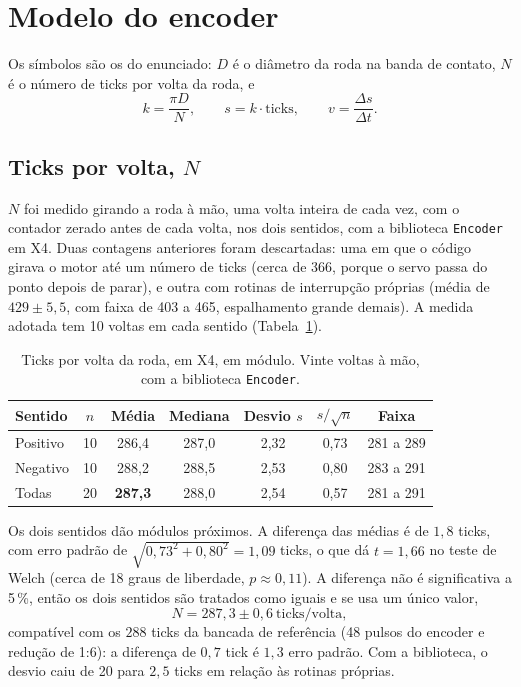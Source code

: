\documentclass[11pt,a4paper]{article}
\begin{document}
\section{Modelo do encoder}
\label{sec:encoder}

Os símbolos são os do enunciado: $D$ é o diâmetro da roda na banda de contato, $N$ é o número de ticks por volta da roda, e
\begin{equation}
  k = \frac{\pi D}{N}, \qquad s = k \cdot \text{ticks}, \qquad v = \frac{\Delta s}{\Delta t}.
\end{equation}

\subsection{Ticks por volta, $N$}

$N$ foi medido girando a roda à mão, uma volta inteira de cada vez, com o contador zerado antes de cada volta, nos dois sentidos, com a biblioteca \texttt{Encoder} em X4. Duas contagens anteriores foram descartadas: uma em que o código girava o motor até um número de ticks (cerca de 366, porque o servo passa do ponto depois de parar), e outra com rotinas de interrupção próprias (média de $429 \pm 5{,}5$, com faixa de 403 a 465, espalhamento grande demais). A medida adotada tem 10 voltas em cada sentido (Tabela~\ref{tab:N}).

\begin{table}[htbp]
\centering
\caption{Ticks por volta da roda, em X4, em módulo. Vinte voltas à mão, com a biblioteca \texttt{Encoder}.}
\label{tab:N}
\begin{tabular}{lcccccc}
\toprule
Sentido & $n$ & Média & Mediana & Desvio $s$ & $s/\sqrt{n}$ & Faixa \\
\midrule
Positivo & 10 & 286,4 & 287,0 & 2,32 & 0,73 & 281 a 289 \\
Negativo & 10 & 288,2 & 288,5 & 2,53 & 0,80 & 283 a 291 \\
Todas    & 20 & \textbf{287,3} & 288,0 & 2,54 & 0,57 & 281 a 291 \\
\bottomrule
\end{tabular}
\end{table}

Os dois sentidos dão módulos próximos. A diferença das médias é de $1{,}8$ ticks, com erro padrão de $\sqrt{0{,}73^2 + 0{,}80^2} = 1{,}09$ ticks, o que dá $t = 1{,}66$ no teste de Welch (cerca de 18 graus de liberdade, $p \approx 0{,}11$). A diferença não é significativa a 5\,\%, então os dois sentidos são tratados como iguais e se usa um único valor,
\begin{equation}
  N = 287{,}3 \pm 0{,}6 \ \text{ticks/volta},
\end{equation}
compatível com os $288$ ticks da bancada de referência (48 pulsos do encoder e redução de 1:6): a diferença de $0{,}7$ tick é $1{,}3$ erro padrão. Com a biblioteca, o desvio caiu de 20 para $2{,}5$ ticks em relação às rotinas próprias.
\end{document}
